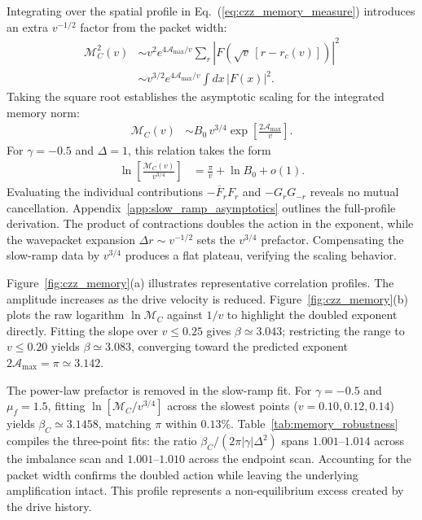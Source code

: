 \documentclass[aps,prb,reprint,superscriptaddress,amsmath,amssymb,floatfix]{revtex4-2}
\begin{document}
Integrating over the spatial profile in Eq.~(\ref{eq:czz_memory_measure}) introduces an extra $v^{-1/2}$ factor from the packet width:
\begin{equation}
\begin{aligned}
\mathcal M_C^2(v) &\sim v^2 e^{4\mathcal A_{\max}/v} \sum_r \left| F\!\left( \sqrt v\,[r-r_c(v)] \right) \right|^2 \\ &\sim v^{3/2}e^{4\mathcal A_{\max}/v} \int dx\,|F(x)|^2 .
\end{aligned} \label{eq:czz_memory_norm_squared}
\end{equation}
Taking the square root establishes the asymptotic scaling for the integrated memory norm:
\begin{equation}
\begin{aligned}
\mathcal M_C(v) &\sim B_0\,v^{3/4} \exp\left[ \frac{2\mathcal A_{\max}}{v} \right].
\end{aligned} \label{eq:czz_memory_prefactor}
\end{equation}
For $\gamma=-0.5$ and $\Delta=1$, this relation takes the form
\begin{equation}
\begin{aligned}
\ln\!\left[ \frac{\mathcal M_C(v)}{v^{3/4}} \right] &= \frac{\pi}{v} +\ln B_0+{o(1)}.
\end{aligned} \label{eq:czz_memory_exponential}
\end{equation}
Evaluating the individual contributions $-\overline F_rF_r$ and $-G_rG_{-r}$ reveals no mutual cancellation. Appendix~\ref{app:slow_ramp_asymptotics} outlines the full-profile derivation. The product of contractions doubles the action in the exponent, while the wavepacket expansion $\Delta r\sim v^{-1/2}$ sets the $v^{3/4}$ prefactor. Compensating the slow-ramp data by $v^{3/4}$ produces a flat plateau, verifying the scaling behavior.

Figure~\ref{fig:czz_memory}(a) illustrates representative correlation profiles. The amplitude increases as the drive velocity is reduced. Figure~\ref{fig:czz_memory}(b) plots the raw logarithm $\ln\mathcal M_C$ against $1/v$ to highlight the doubled exponent directly. Fitting the slope over $v\le0.25$ gives $\beta\simeq3.043$; restricting the range to $v\le0.20$ yields $\beta\simeq3.083$, converging toward the predicted exponent $2\mathcal A_{\max}=\pi\simeq3.142$.

The power-law prefactor is removed in the slow-ramp fit. For $\gamma=-0.5$ and $\mu_f=1.5$, fitting $\ln[\mathcal M_C/v^{3/4}]$ across the slowest points ($v=0.10, 0.12, 0.14$) yields $\beta_C\simeq3.1458$, matching $\pi$ within $0.13\%$. Table~\ref{tab:memory_robustness} compiles the three-point fits: the ratio $\beta_C/(2\pi\vert{}\gamma\vert{}\Delta^2)$ spans $1.001$--$1.014$ across the imbalance scan and $1.001$--$1.010$ across the endpoint scan. Accounting for the packet width confirms the doubled action while leaving the underlying amplification intact. This profile represents a non-equilibrium excess created by the drive history.
\end{document}
